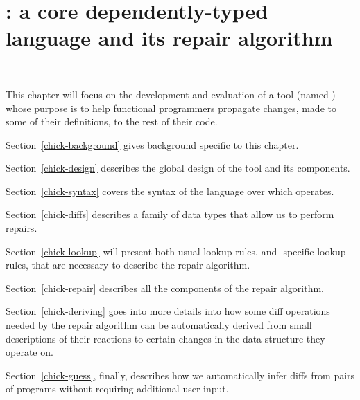 \chapter{\Chick{}: a core dependently-typed language and its repair
algorithm}~\label{chick}

This chapter will focus on the development and evaluation of a tool (named
\Chick{}\footnotemark{}) whose purpose is to help functional programmers
propagate changes, made to some of their definitions, to the rest of their code.


Section~\ref{chick-background} gives background specific to this chapter.

Section~\ref{chick-design} describes the global design of the tool and its
components.

Section~\ref{chick-syntax} covers the syntax of the language over which \Chick{}
operates.

Section~\ref{chick-diffs} describes a family of data types that allow us to
perform repairs.

Section~\ref{chick-lookup} will present both usual lookup rules, and
\Chick{}-specific lookup rules, that are necessary to describe the repair
algorithm.

Section~\ref{chick-repair} describes all the components of the repair algorithm.

Section~\ref{chick-deriving} goes into more details into how some diff
operations needed by the repair algorithm can be automatically derived from
small descriptions of their reactions to certain changes in the data structure
they operate on.

Section~\ref{chick-guess}, finally, describes how we automatically infer diffs
from pairs of programs without requiring additional user input.










